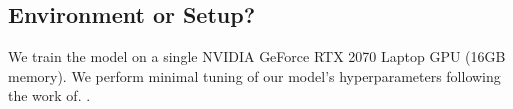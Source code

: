 \subsection{Environment or Setup?}
We train the model on a single NVIDIA GeForce RTX 2070 Laptop GPU (16GB memory). We perform minimal tuning of our model's hyperparameters following the work of.
.
